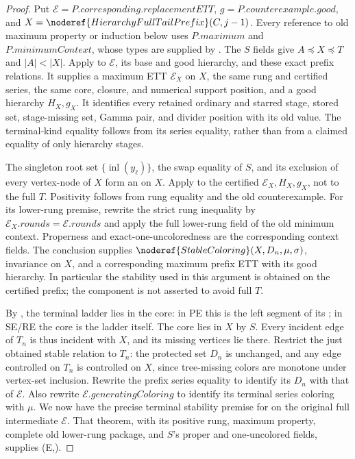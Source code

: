 \begin{proof}
Put \(\mathcal E=P.\mathit{corresponding.replacementETT}\),
\(g=P.\mathit{counterexample.good}\), and
\(X=\noderef{HierarchyFullTailPrefix}(C,j-1)\).
Every reference to old maximum property or induction below uses
\(P.\mathit{maximum}\) and \(P.\mathit{minimumContext}\), whose
types are supplied by .
The \(S\) fields give \(A\preccurlyeq X\preccurlyeq T\) and
\(|A|<|X|\). Apply 
to \(\mathcal E\), its base and good hierarchy, and these exact
prefix relations. It supplies a maximum ETT \(\mathcal E_X\) on
\(X\), the same rung and certified series, the same core, closure,
and numerical support position, and a good hierarchy \(H_X,g_X\).
It identifies every retained ordinary and starred stage, stored set,
stage-missing set, Gamma pair, and divider position with its old value.
The terminal-kind equality follows from its series equality, rather
than from a claimed equality of only hierarchy stages.

The singleton root set \(\{\operatorname{inl}(y_\ell)\}\), the
swap equality of \(S\), and its exclusion of every vertex-node of
\(X\) form an  on \(X\).
Apply  to the certified
\(\mathcal E_X,H_X,g_X\), not to the full \(T\).
Positivity follows from rung equality and the old counterexample.
For its lower-rung premise, rewrite the strict rung inequality by
\(\mathcal E_X.\mathit{rounds}=\mathcal E.\mathit{rounds}\)
and apply the full lower-rung field of the old minimum context.
Properness and exact-one-uncoloredness are the corresponding context
fields. The conclusion supplies
\(\noderef{StableColoring}(X,D_n,\mu,\sigma)\), invariance on \(X\),
and a corresponding maximum prefix ETT with its good hierarchy.
In particular the stability used in this argument is obtained on the
certified prefix; the component is not asserted to avoid full \(T\).

By , the terminal ladder lies in the core:
in PE this is the left segment of its ;
in SE/RE the core is the ladder itself. The core lies in \(X\)
by \(S\). Every incident edge of \(T_n\) is thus incident with
\(X\), and its missing vertices lie there. Restrict the just obtained
stable relation to \(T_n\): the protected set \(D_n\) is unchanged,
and any edge controlled on \(T_n\) is controlled on \(X\), since
tree-missing colors are monotone under vertex-set inclusion.
Rewrite the prefix series equality to identify its \(D_n\) with
that of \(\mathcal E\). Also rewrite
\(\mathcal E.\mathit{generatingColoring}\) to identify its terminal
series coloring with \(\mu\). We now have the precise terminal
stability premise for  on the original full intermediate
\(\mathcal E\). That theorem, with its positive rung, maximum
property, complete old lower-rung package, and \(S\)'s proper and
one-uncolored fields, supplies (\mathcal E,\sigma).


\end{proof}
